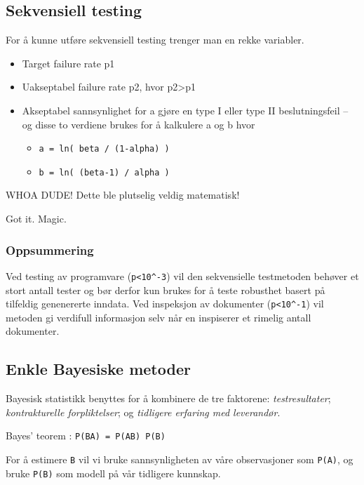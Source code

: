 \subsection{Sekvensiell testing}

For å kunne utføre sekvensiell testing trenger man en rekke variabler.

\begin{itemize}
\item
  Target failure rate p1
\item
  Uakseptabel failure rate p2, hvor p2\textgreater{}p1
\item
  Akseptabel sannsynlighet for a gjøre en type I eller type II
  beslutningsfeil -- og disse to verdiene brukes for å kalkulere a og b
  hvor
  \begin{itemize}
  \item
    \texttt{a = ln(   beta   / (1-alpha) )}
  \item
    \texttt{b = ln( (beta-1) /   alpha  )}
  \end{itemize}
\end{itemize}
WHOA DUDE! Dette ble plutselig veldig matematisk!

Got it. Magic.

\subsubsection{Oppsummering}

Ved testing av programvare (\texttt{p\textless{}10\^{}-3}) vil den
sekvensielle testmetoden behøver et stort antall tester og bør derfor
kun brukes for å teste robusthet basert på tilfeldig genenererte
inndata. Ved inspeksjon av dokumenter (\texttt{p\textless{}10\^{}-1})
vil metoden gi verdifull informasjon selv når en inspiserer et rimelig
antall dokumenter.

\subsection{Enkle Bayesiske metoder}

Bayesisk statistikk benyttes for å kombinere de tre faktorene:
\emph{testresultater}; \emph{kontrakturelle forpliktelser}; og
\emph{tidligere erfaring med leverandør}.

Bayes' teorem : \texttt{P(B\textbar{}A) = P(A\textbar{}B) P(B)}

For å estimere \texttt{B} vil vi bruke sannsynligheten av våre
observasjoner som \texttt{P(A)}, og bruke \texttt{P(B)} som modell på
vår tidligere kunnskap.

